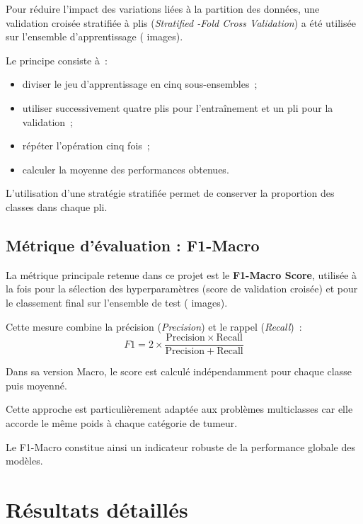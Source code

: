 Pour réduire l'impact des variations liées à la partition des données, une validation croisée
stratifiée à \cvFolds{} plis (\emph{Stratified \cvFolds{}-Fold Cross Validation}) a été
utilisée sur l'ensemble d'apprentissage (\NTrain{} images).

Le principe consiste à~:
\begin{itemize}[leftmargin=1.4em,itemsep=2pt]
  \item diviser le jeu d'apprentissage en cinq sous-ensembles~;
  \item utiliser successivement quatre plis pour l'entraînement et un pli pour la validation~;
  \item répéter l'opération cinq fois~;
  \item calculer la moyenne des performances obtenues.
\end{itemize}

L'utilisation d'une stratégie stratifiée permet de conserver la proportion des classes dans
chaque pli.

\subsection{Métrique d'évaluation : F1-Macro}

La métrique principale retenue dans ce projet est le \textbf{F1-Macro Score}, utilisée à la
fois pour la sélection des hyperparamètres (score de validation croisée) et pour le
classement final sur l'ensemble de test (\NTest{} images).

Cette mesure combine la précision (\emph{Precision}) et le rappel (\emph{Recall})~:
\begin{equation}
  F1 = 2 \times \frac{\mathrm{Precision} \times \mathrm{Recall}}
                    {\mathrm{Precision} + \mathrm{Recall}}
\end{equation}

Dans sa version Macro, le score est calculé indépendamment pour chaque classe puis moyenné.

Cette approche est particulièrement adaptée aux problèmes multiclasses car elle accorde le même
poids à chaque catégorie de tumeur.

Le F1-Macro constitue ainsi un indicateur robuste de la performance globale des modèles.

\section{Résultats détaillés}

